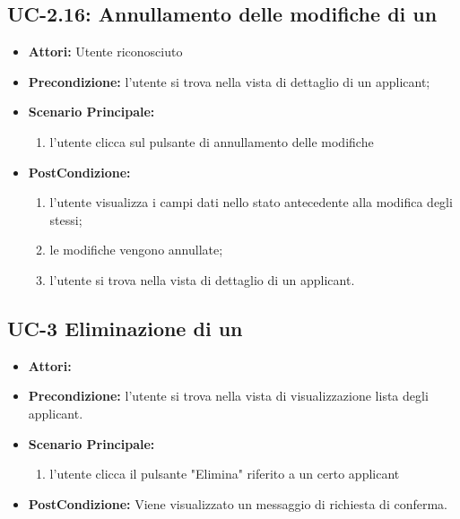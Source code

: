 \subsection{UC-2.16: Annullamento delle modifiche di un \applicant}
\begin{itemize}
	\item \textbf{Attori:} Utente riconosciuto
	\item \textbf{Precondizione:}  l'utente si trova nella vista di dettaglio di un applicant;
	\item \textbf{Scenario Principale:}
	\begin{enumerate}
		\item l'utente clicca sul pulsante di annullamento delle modifiche
	\end{enumerate}
	\item \textbf{PostCondizione:} 
	\begin{enumerate}
		\item l'utente visualizza i campi dati nello stato antecedente alla modifica degli stessi;
		\item le modifiche vengono annullate;
		\item l'utente si trova nella vista di dettaglio di un applicant.
	\end{enumerate}
	
\end{itemize}


\subsection{UC-3 Eliminazione di un\applicant}
\begin{itemize}
\item \textbf{Attori:}\loggedusr
\item \textbf{Precondizione:} l'utente si trova nella vista di visualizzazione lista degli applicant.
\item \textbf{Scenario Principale:}
\begin{enumerate}
	\item l'utente clicca il pulsante "Elimina" riferito a un certo applicant
\end{enumerate}
\item \textbf{PostCondizione:} Viene visualizzato un messaggio di richiesta di conferma.
\end{itemize}

